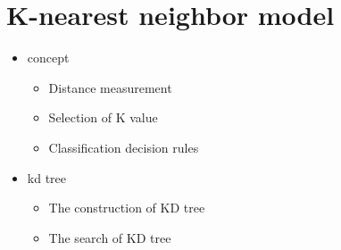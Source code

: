 \documentclass{amsart}
\begin{document}
\section{K-nearest neighbor model}
\begin{itemize}
    \item concept
        \begin{itemize}
            \item Distance measurement
            \item Selection of K value
            \item Classification decision rules
        \end{itemize}
    \item kd tree
        \begin{itemize}
            \item The construction of KD tree
            \item The search of KD tree
        \end{itemize}
\end{itemize}
\end{document}

